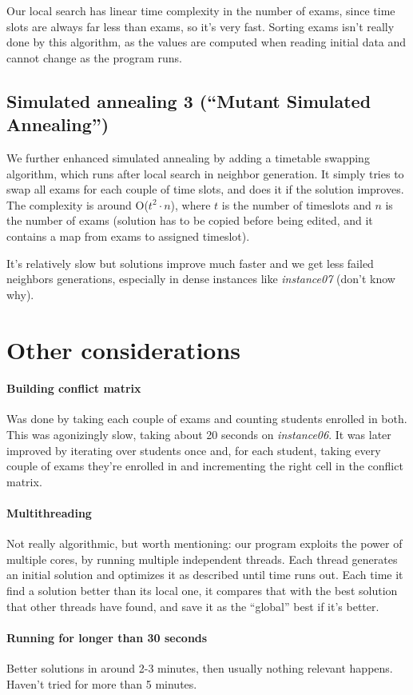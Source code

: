 \documentclass[11pt, a4paper, leqno]{article}
\begin{document}
	Our local search has linear time complexity in the number of exams, since time slots are always far less than exams, so it's very fast. Sorting exams isn't really done by this algorithm, as the values are computed when reading initial data and cannot change as the program runs.
	
	\subsection{Simulated annealing 3 (``Mutant Simulated Annealing\texttrademark'')}
	
	We further enhanced simulated annealing by adding a timetable swapping algorithm, which runs after local search in neighbor generation. It simply tries to swap all exams for each couple of time slots, and does it if the solution improves. The complexity is around O($t^2\cdot n$), where $t$ is the number of timeslots and $n$ is the number of exams (solution has to be copied before being edited, and it contains a map from exams to assigned timeslot).
	
	It's relatively slow but solutions improve much faster and we get less failed neighbors generations, especially in dense instances like \textit{instance07} (don't know why).
	
	\section{Other considerations}
	
	\paragraph{Building conflict matrix}
	
	Was done by taking each couple of exams and counting students enrolled in both. This was agonizingly slow, taking about 20 seconds on \textit{instance06}. It was later improved by iterating over students once and, for each student, taking every couple of exams they're enrolled in and incrementing the right cell in the conflict matrix.
	
	\paragraph{Multithreading}
	
	Not really algorithmic, but worth mentioning: our program exploits the power of multiple cores, by running multiple independent threads. Each thread generates an initial solution and optimizes it as described until time runs out. Each time it find a solution better than its local one, it compares that with the best solution that other threads have found, and save it as the ``global'' best if it's better.
	
	\paragraph{Running for longer than 30 seconds}
	
	Better solutions in around 2-3 minutes, then usually nothing relevant happens. Haven't tried for more than 5 minutes.
	
	
\end{document}
